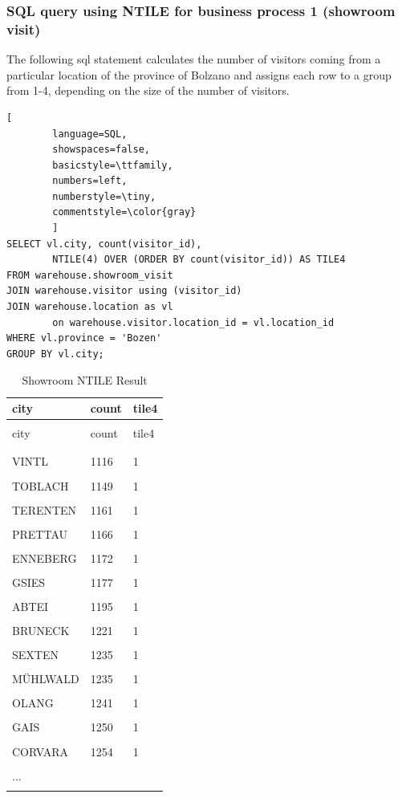 \documentclass[letterpaper,12pt]{article}
\begin{document}
\subsubsection{SQL query using NTILE for business process 1 (showroom visit)}

The following sql statement calculates the number of visitors coming from a particular location of the province of Bolzano and assigns each row to a group from 1-4, depending on the size of the number of visitors.

\begin{lstlisting}[
        language=SQL,
        showspaces=false,
        basicstyle=\ttfamily,
        numbers=left,
        numberstyle=\tiny,
        commentstyle=\color{gray}
        ]	 
SELECT vl.city, count(visitor_id), 
        NTILE(4) OVER (ORDER BY count(visitor_id)) AS TILE4
FROM warehouse.showroom_visit
JOIN warehouse.visitor using (visitor_id)
JOIN warehouse.location as vl 
        on warehouse.visitor.location_id = vl.location_id 
WHERE vl.province = 'Bozen'
GROUP BY vl.city;
\end{lstlisting}

\begingroup
\renewcommand\arraystretch{0.5}
\begin{longtable}{p{4cm}p{4cm}p{4cm}}
        \caption{Showroom NTILE Result} \\
				city & count & tile4 \\
        \endfirsthead \\
        city & count & tile4 \\
        \endhead \\
				\hline \\
VINTL & 1116 & 1 \\
\hline \\
TOBLACH & 1149 & 1 \\
\hline \\
TERENTEN & 1161 & 1 \\
\hline \\
PRETTAU & 1166 & 1 \\
\hline \\
ENNEBERG & 1172 & 1 \\
\hline \\
GSIES & 1177 & 1 \\
\hline \\
ABTEI & 1195 & 1 \\
\hline \\
BRUNECK & 1221 & 1 \\
\hline \\
SEXTEN & 1235 & 1 \\
\hline \\
MÜHLWALD & 1235 & 1 \\
\hline \\
OLANG & 1241 & 1 \\
\hline \\
GAIS & 1250 & 1 \\
\hline \\
CORVARA & 1254 & 1 \\
\hline \\
... & & \\
\hline \\
\end{longtable} 
\endgroup
      
\end{document}
